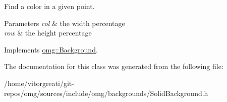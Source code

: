 Find a color in a given point. 


\begin{DoxyParams}{Parameters}
{\em col} & the width percentage \\
\hline
{\em row} & the height percentage \\
\hline
\end{DoxyParams}


Implements \mbox{\hyperlink{classomg_1_1_background_a9f98d6bc2e213de258b5c3e45040b462}{omg\+::\+Background}}.



The documentation for this class was generated from the following file\+:\begin{DoxyCompactItemize}
\item 
/home/vitorgreati/git-\/repos/omg/sources/include/omg/backgrounds/Solid\+Background.\+h\end{DoxyCompactItemize}
